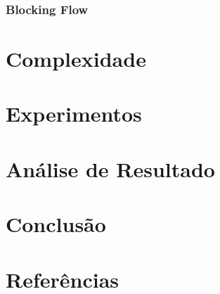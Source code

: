 \documentclass[
	12pt,
	a4paper,
	twoside,
	brazil
]{article}
\theoremstyle{definition}
\begin{document}
	\subsubsection{Blocking Flow}
	
	\section{Complexidade}
	
	\section{Experimentos}
	
	\section{Análise de Resultado}
	
	\section{Conclusão}
	
	\section{Referências}
\end{document}
